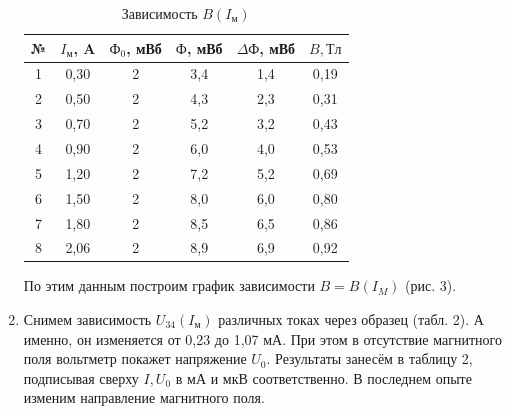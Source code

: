 \documentclass[12pt]{kiarticle} %
\begin{document}
\begin{enumerate}
  		
  	
  		\begin{table}[]
  			\caption{Зависимость $B(I_{м})$}
  		\begin{center}
  		\begin{tabular}{|c|c|c|c|c|c|} 
  			\hline 
  			№ &  $I_{м}$, A &  $Ф_{0}$, мВб & $Ф$, мВб & $\Delta Ф$, мВб & $B, Тл$  \\ 	\hline
  			
  			1 & 0,30 & 2 & 3,4 & 1,4 & 0,19 \\
  			2 & 0,50 & 2 & 4,3 & 2,3 & 0,31 \\
  			3 & 0,70 & 2 & 5,2 & 3,2 & 0,43 \\
  			4 & 0,90 & 2 & 6,0 & 4,0 & 0,53 \\
  			5 & 1,20 & 2 & 7,2 & 5,2 & 0,69 \\
  			6 & 1,50 & 2 & 8,0 & 6,0 & 0,80\\
  			7 & 1,80 & 2 & 8,5 & 6,5 & 0,86\\
  			8 & 2,06 & 2 & 8,9 & 6,9 & 0,92\\
  			\hline
  			
  		\end{tabular}
  	\end{center}
  \end{table}

  	По этим данным построим график зависимости $B=B(I_{M})$ (рис. 3).
  	
  	\item Снимем зависимость $U_{34}(I_{м})$ различных токах через образец (табл. 2). А именно, он изменяется от 0,23 до 1,07 мА. При этом в отсутствие магнитного поля вольтметр покажет напряжение $U_{0}$. Результаты занесём в таблицу 2, подписывая сверху $ I, U_0 $  в мА и мкВ соответственно. В последнем опыте изменим направление магнитного поля.  
  

\end{enumerate}
\end{document}
